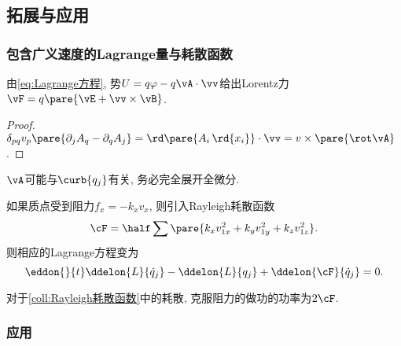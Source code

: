 \documentclass[../TheoreticalMechanics.tex]{subfiles}
\begin{document}


\subsection{拓展与应用} %
\label{sub:拓展与应用}

\subsubsection{包含广义速度的Lagrange量与耗散函数} %
\label{ssub:包含广义速度的lagrange量与耗散函数}

\begin{corollary}[Lorentz力]
	\label{coll:Lorentz力由Lagrange方程导出}
	由\eqref{eq:Lagrange方程}, 势$U = q\varphi - q\vA\cdot\vv$给出Lorentz力$\vF = q\pare{\vE + \vv\times\vB}$.
\end{corollary}
\begin{proof}
	$\delta_{pq}v_p\pare{\partial_j A_q - \partial_q A_j} = \rd\pare{A_i\,\rd{x_i}}\cdot\vv = v\times\pare{\rot\vA}$.
\end{proof}
\begin{pitfall}
	$\vA$可能与$\curb{q_j}$有关, 务必完全展开全微分.
\end{pitfall}
\begin{corollary}[Rayleigh耗散函数]
	\label{coll:Rayleigh耗散函数}
	如果质点受到阻力$f_x = -k_x v_x$, 则引入Rayleigh耗散函数
	\[ \cF = \half \sum\pare{k_x v_{1x}^2 + k_y v_{1y}^2 + k_z v_{1z}^2}. \]
	则相应的Lagrange方程变为
	\[ \eddon{}{t}\ddelon{L}{\dot{q}_j} - \ddelon{L}{q_j} + \ddelon{\cF}{\dot{q}_j} = 0. \]
\end{corollary}
\begin{corollary}[阻尼耗散的功]
	对于\cref{coll:Rayleigh耗散函数}中的耗散, 克服阻力的做功的功率为$2\cF$.
\end{corollary}


\subsubsection{应用} %
\label{ssub:应用}
\end{document}
